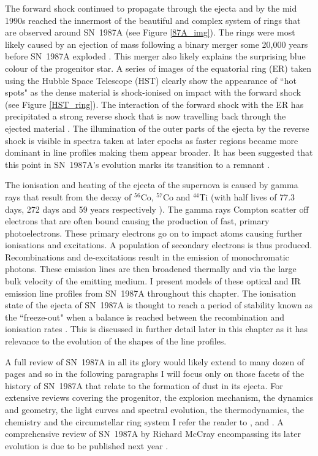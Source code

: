 The forward shock continued to propagate through the ejecta and by the mid 1990s reached the innermost of the beautiful and complex system of rings that are observed around SN~1987A (see Figure \ref{87A_img}).  The rings were most likely caused by an ejection of mass following a binary merger some 20,000 years before SN~1987A exploded \citep{Morris2005,Fitzpatrick2013}.  This merger also likely explains the surprising blue colour of the progenitor star.  A series of images of the equatorial ring (ER) taken using the Hubble Space Telescope (HST)  clearly show the appearance of ``hot spots" as the dense material is shock-ionised on impact with the forward shock (see Figure \ref{HST_ring}).  The interaction of the forward shock with the ER has precipitated a strong reverse shock that is now travelling back through the ejected material \citep{Fransson2013}.  The illumination of the outer parts of the ejecta by the reverse shock is visible in spectra taken at later epochs as faster regions became more dominant in line profiles making them appear broader.  It has been suggested that this point in SN~1987A's evolution marks its transition to a remnant \citep{McCray2003}.

The ionisation and heating of the ejecta of the supernova is caused by gamma rays that result from the decay of $^{56}$Co, $^{57}$Co and $^{44}$Ti (with half lives of 77.3 days, 272 days and 59 years respectively \citep{Manuel2002}).  The gamma rays Compton scatter off electrons that are often bound causing the production of fast, primary photoelectrons. These primary electrons go on to impact atoms causing further ionisations and excitations. A population of secondary electrons is thus produced.  Recombinations and de-excitations result in the emission of monochromatic photons.  These emission lines are then broadened thermally and via the large bulk velocity of the emitting medium.  I present models of these optical and IR emission line profiles from SN~1987A throughout this chapter.  The ionisation state of the ejecta of SN~1987A is thought to reach a period of stability known as the ``freeze-out" when a balance is reached between the recombination and ionisation rates \citep{Danziger1991,Kozma1998a,Fransson2013}.  This is discussed in further detail later in this chapter as it has relevance to the evolution of the shapes of the line profiles.

A full review of SN~1987A in all its glory would likely extend to many dozen of pages and so in the following paragraphs I will focus only on those facets of the history of SN~1987A that relate to the formation of dust in its ejecta.  For extensive reviews covering the progenitor, the explosion mechanism, the dynamics and geometry, the light curves and spectral evolution, the thermodynamics, the chemistry and the circumstellar ring system I refer the reader to \citet{Arnett1989}, \citet{McCray1993} and \citet{McCray2003}.  A comprehensive review of SN~1987A by Richard McCray encompassing its later evolution is due to be published next year \citep{McCray2016}.


